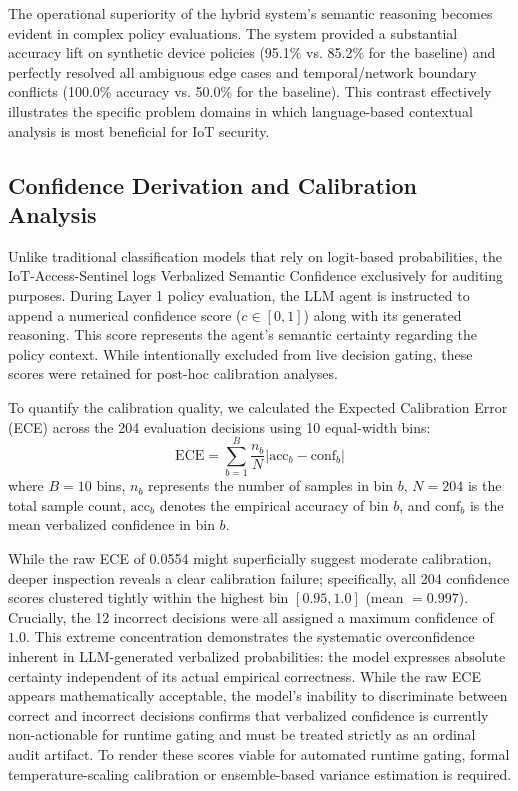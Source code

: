 \documentclass[
]{ceurart}
\begin{document}
The operational superiority of the hybrid system's semantic reasoning becomes evident in complex policy evaluations. The system provided a substantial accuracy lift on synthetic device policies (95.1\% vs. 85.2\% for the baseline) and perfectly resolved all ambiguous edge cases and temporal/network boundary conflicts (100.0\% accuracy vs. 50.0\% for the baseline). This contrast effectively illustrates the specific problem domains in which language-based contextual analysis is most beneficial for IoT security.


\subsection{Confidence Derivation and Calibration Analysis}

Unlike traditional classification models that rely on logit-based probabilities, the IoT-Access-Sentinel logs Verbalized Semantic Confidence exclusively for auditing purposes. During Layer 1 policy evaluation, the LLM agent is instructed to append a numerical confidence score ($c \in [0, 1]$) along with its generated reasoning. This score represents the agent's semantic certainty regarding the policy context. While intentionally excluded from live decision gating, these scores were retained for post-hoc calibration analyses.

To quantify the calibration quality, we calculated the Expected Calibration Error (ECE) across the 204 evaluation decisions using 10 equal-width bins:
\[
\text{ECE} = \sum_{b=1}^{B} \frac{n_b}{N} \left| \text{acc}_b - \text{conf}_b \right|
\]
where $B=10$ bins, $n_b$ represents the number of samples in bin $b$, $N=204$ is the total sample count, $\text{acc}_b$ denotes the empirical accuracy of bin $b$, and $\text{conf}_b$ is the mean verbalized confidence in bin $b$.

While the raw ECE of 0.0554 might superficially suggest moderate calibration, deeper inspection reveals a clear calibration failure; specifically, all 204 confidence scores clustered tightly within the highest bin $[0.95, 1.0]$ (mean $= 0.997$). Crucially, the 12 incorrect decisions were all assigned a maximum confidence of $1.0$. This extreme concentration demonstrates the systematic overconfidence inherent in LLM-generated verbalized probabilities: the model expresses absolute certainty independent of its actual empirical correctness. While the raw ECE appears mathematically acceptable, the model's inability to discriminate between correct and incorrect decisions confirms that verbalized confidence is currently non-actionable for runtime gating and must be treated strictly as an ordinal audit artifact. To render these scores viable for automated runtime gating, formal temperature-scaling calibration or ensemble-based variance estimation is required.
\end{document}
